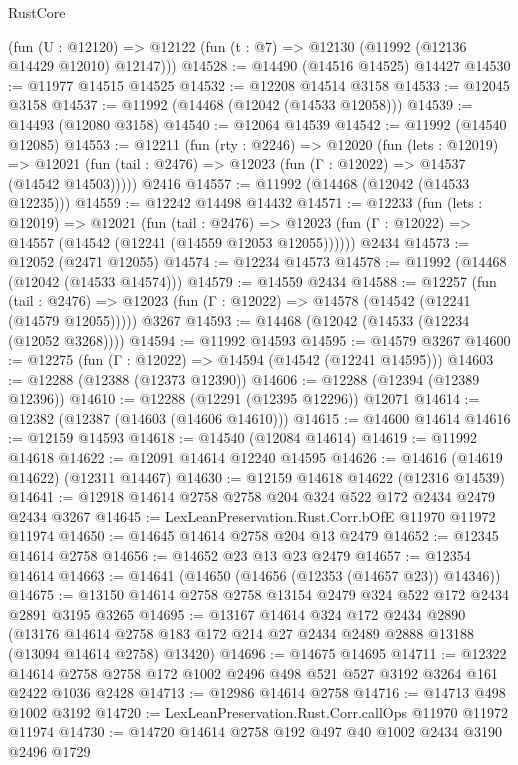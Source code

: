 \begin{lexlean}{RustCore}
\begin{coremodule}
    (fun (U : @12120) => @12122 (fun (t : @7) => @12130 (@11992 (@12136 @14429 @12010) @12147)))
@14528 := @14490 (@14516 @14525) @14427
@14530 := @11977 @14515 @14525
@14532 := @12208 @14514 @3158
@14533 := @12045 @3158
@14537 := @11992 (@14468 (@12042 (@14533 @12058)))
@14539 := @14493 (@12080 @3158)
@14540 := @12064 @14539
@14542 := @11992 (@14540 @12085)
@14553 := @12211
    (fun (rty : @2246) =>
    @12020
      (fun (lets : @12019) =>
      @12021 (fun (tail : @2476) => @12023 (fun (Γ : @12022) => @14537 (@14542 @14503)))))
    @2416
@14557 := @11992 (@14468 (@12042 (@14533 @12235)))
@14559 := @12242 @14498 @14432
@14571 := @12233
    (fun (lets : @12019) =>
    @12021
      (fun (tail : @2476) =>
      @12023 (fun (Γ : @12022) => @14557 (@14542 (@12241 (@14559 @12053 @12055))))))
    @2434
@14573 := @12052 (@2471 @12055)
@14574 := @12234 @14573
@14578 := @11992 (@14468 (@12042 (@14533 @14574)))
@14579 := @14559 @2434
@14588 := @12257
    (fun (tail : @2476) => @12023 (fun (Γ : @12022) => @14578 (@14542 (@12241 (@14579 @12055)))))
    @3267
@14593 := @14468 (@12042 (@14533 (@12234 (@12052 @3268))))
@14594 := @11992 @14593
@14595 := @14579 @3267
@14600 := @12275 (fun (Γ : @12022) => @14594 (@14542 (@12241 @14595)))
@14603 := @12288 (@12388 (@12373 @12390))
@14606 := @12288 (@12394 (@12389 @12396))
@14610 := @12288 (@12291 (@12395 @12296)) @12071
@14614 := @12382 (@12387 (@14603 (@14606 @14610)))
@14615 := @14600 @14614
@14616 := @12159 @14593
@14618 := @14540 (@12084 @14614)
@14619 := @11992 @14618
@14622 := @12091 @14614 @12240 @14595
@14626 := @14616 (@14619 @14622) (@12311 @14467)
@14630 := @12159 @14618 @14622 (@12316 @14539)
@14641 := @12918 @14614 @2758 @2758 @204 @324 @522 @172 @2434 @2479 @2434 @3267
@14645 := LexLeanPreservation.Rust.Corr.bOfE @11970 @11972 @11974
@14650 := @14645 @14614 @2758 @204 @13 @2479
@14652 := @12345 @14614 @2758
@14656 := @14652 @23 @13 @23 @2479
@14657 := @12354 @14614
@14663 := @14641 (@14650 (@14656 (@12353 (@14657 @23)) @14346))
@14675 := @13150 @14614 @2758 @2758 @13154 @2479 @324 @522 @172 @2434 @2891 @3195 @3265
@14695 := @13167
    @14614
    @324
    @172
    @2434
    @2890
    (@13176 @14614 @2758 @183 @172 @214 @27 @2434 @2489 @2888 @13188 (@13094 @14614 @2758) @13420)
@14696 := @14675 @14695
@14711 := @12322
    @14614
    @2758
    @2758
    @172
    @1002
    @2496
    @498
    @521
    @527
    @3192
    @3264
    @161
    @2422
    @1036
    @2428
@14713 := @12986 @14614 @2758
@14716 := @14713 @498 @1002 @3192
@14720 := LexLeanPreservation.Rust.Corr.callOps @11970 @11972 @11974
@14730 := @14720 @14614 @2758 @192 @497 @40 @1002 @2434 @3190 @2496 @1729

\end{coremodule}
\end{lexlean}
